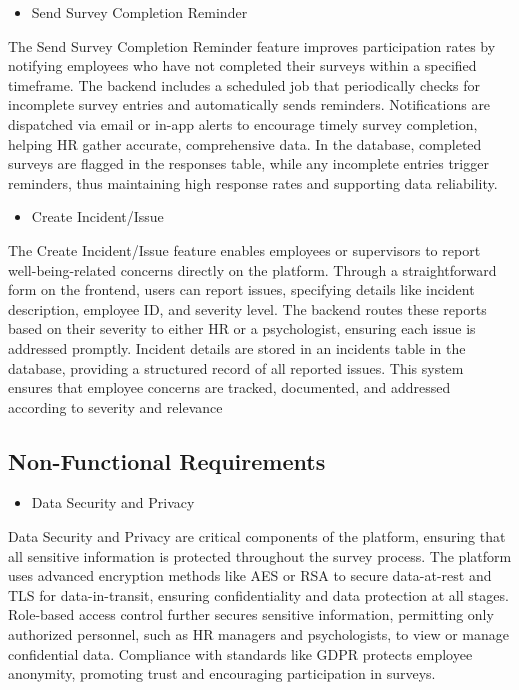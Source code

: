 \documentclass[conference]{IEEEtran}
\begin{document}
     \begin{itemize}
        \item Send Survey Completion Reminder
    \end{itemize}
    
    The Send Survey Completion Reminder feature improves 
    participation rates by notifying employees who have not 
    completed their surveys within a specified timeframe. The 
    backend includes a scheduled job that periodically checks 
    for incomplete survey entries and automatically sends 
    reminders. Notifications are dispatched via email or in-app 
    alerts to encourage timely survey completion, helping HR gather 
    accurate, comprehensive data. In the database, completed surveys 
    are flagged in the responses table, while any incomplete entries
    trigger reminders, thus maintaining high response rates and 
    supporting data reliability.
    \newline    

     \begin{itemize}
        \item Create Incident/Issue
    \end{itemize}
    
    The Create Incident/Issue feature enables employees or supervisors 
    to report well-being-related concerns directly on the platform. 
    Through a straightforward form on the frontend, users can report 
    issues, specifying details like incident description, employee ID, 
    and severity level. The backend routes these reports based on their 
    severity to either HR or a psychologist, ensuring each issue is 
    addressed promptly. Incident details are stored in an incidents
    table in the database, providing a structured record of all 
    reported issues. This system ensures that employee concerns are 
    tracked, documented, and addressed according to severity and 
    relevance
    \newline    

    \subsection {Non-Functional Requirements}
   
    \begin{itemize}
        \item Data Security and Privacy
        \end{itemize}
    
    Data Security and Privacy are critical components of the platform, 
    ensuring that all sensitive information is protected throughout the 
    survey process. The platform uses advanced encryption methods like 
    AES or RSA to secure data-at-rest and TLS for data-in-transit, 
    ensuring confidentiality and data protection at all stages. 
    Role-based access control further secures sensitive information, 
    permitting only authorized personnel, such as HR managers and 
    psychologists, to view or manage confidential data. Compliance with
    standards like GDPR protects employee anonymity, promoting trust 
    and encouraging participation in surveys.
    \newline    
\end{document}
